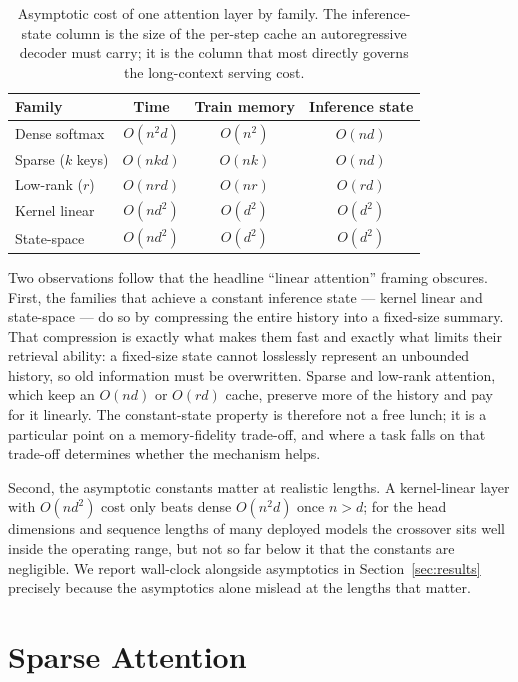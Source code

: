 \documentclass[11pt]{article}
\begin{document}
\begin{table}[t]
  \centering
  \begin{tabular}{lccc}
    \toprule
    Family & Time & Train memory & Inference state \\
    \midrule
    Dense softmax        & $O(n^2 d)$  & $O(n^2)$    & $O(n d)$   \\
    Sparse ($k$ keys)    & $O(n k d)$  & $O(n k)$    & $O(n d)$   \\
    Low-rank ($r$)       & $O(n r d)$  & $O(n r)$    & $O(r d)$   \\
    Kernel linear        & $O(n d^2)$  & $O(d^2)$    & $O(d^2)$   \\
    State-space          & $O(n d^2)$  & $O(d^2)$    & $O(d^2)$   \\
    \bottomrule
  \end{tabular}
  \caption{Asymptotic cost of one attention layer by family. The inference-state column is the size of the per-step cache an autoregressive decoder must carry; it is the column that most directly governs the long-context serving cost.}
  \label{tab:complexity}
\end{table}

Two observations follow that the headline ``linear attention'' framing obscures. First, the families that achieve a constant inference state --- kernel linear and state-space --- do so by compressing the entire history into a fixed-size summary. That compression is exactly what makes them fast and exactly what limits their retrieval ability: a fixed-size state cannot losslessly represent an unbounded history, so old information must be overwritten. Sparse and low-rank attention, which keep an $O(nd)$ or $O(rd)$ cache, preserve more of the history and pay for it linearly. The constant-state property is therefore not a free lunch; it is a particular point on a memory-fidelity trade-off, and where a task falls on that trade-off determines whether the mechanism helps.

Second, the asymptotic constants matter at realistic lengths. A kernel-linear layer with $O(n d^2)$ cost only beats dense $O(n^2 d)$ once $n > d$; for the head dimensions and sequence lengths of many deployed models the crossover sits well inside the operating range, but not so far below it that the constants are negligible. We report wall-clock alongside asymptotics in Section~\ref{sec:results} precisely because the asymptotics alone mislead at the lengths that matter.

\section{Sparse Attention}
\label{sec:sparse}
\end{document}

